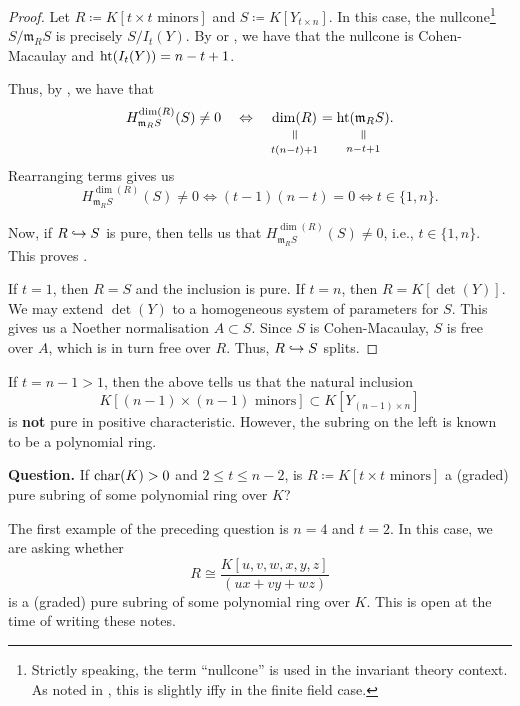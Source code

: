 \documentclass[12pt]{article}
\newcommand{\verteq}{\rotatebox{90}{$\,=$}}
\newcommand{\equalto}[2]{\underset{\scriptstyle\overset{\mkern4mu\verteq}{#2}}{#1}}
\begin{document}
\begin{proof} 
	Let $R \coloneqq K[\text{$t \times t$ minors}]$ and $S \coloneqq K[Y_{t \times n}]$. In this case, the nullcone\footnote{Strictly speaking, the term ``nullcone'' is used in the invariant theory context. As noted in , this is slightly iffy in the finite field case.} $S/\mathfrak{m}_{R} S$ is precisely $S/I_{t}(Y)$. By \cite{EagonNorthcott} or \cite{HochsterEagon}, we have that the nullcone is Cohen-Macaulay and $\operatorname{ht}(I_{t}(Y)) = n - t + 1$.

	Thus, by , we have that
	\begin{equation*} 
		H_{\mathfrak{m}_{R} S}^{\dim(R)}(S) \neq 0 \quad\Leftrightarrow\quad \equalto{\dim(R)}{t(n - t) + 1} = \equalto{\htt(\mathfrak{m}_{R}S)}{n - t + 1}.
	\end{equation*}
	Rearranging terms gives us
	\begin{equation*} 
		H_{\mathfrak{m}_{R} S}^{\dim(R)}(S) \neq 0 \Leftrightarrow (t - 1)(n - t) = 0 \Leftrightarrow t \in \{1, n\}.
	\end{equation*}

	Now, if $R \hookrightarrow S$ is pure, then  tells us that $H_{\mathfrak{m}_{R} S}^{\dim(R)}(S) \neq 0$, i.e., $t \in \{1, n\}$. This proves \forward. 

	\backward If $t = 1$, then $R = S$ and the inclusion is pure. If $t = n$, then $R = K[\det(Y)]$. We may extend $\det(Y)$ to a homogeneous system of parameters for $S$. This gives us a Noether normalisation $A \subset S$. Since $S$ is Cohen-Macaulay, $S$ is free over $A$, which is in turn free over $R$. Thus, $R \hookrightarrow S$ splits.
\end{proof}

\begin{rem}
	If $t = n - 1 > 1$, then the above tells us that the natural inclusion
	\begin{equation*} 
		K[\text{$(n - 1) \times (n - 1)$ minors}] \subset K[Y_{(n - 1) \times n}]
	\end{equation*}
	is \textbf{not} pure in positive characteristic. However, the subring on the left is known to be a polynomial ring.
\end{rem}

\textbf{Question.} If $\operatorname{char}(K) > 0$ and $2 \le t \le n - 2$, is $R \coloneqq K[\text{$t \times t$ minors}]$ a (graded) pure subring of some polynomial ring over $K$? 

The first example of the preceding question is $n = 4$ and $t = 2$. In this case, we are asking whether
\begin{equation*} 
	R \cong \dfrac{K[u, v, w, x, y, z]}{(ux + vy + wz)}
\end{equation*}
is a (graded) pure subring of some polynomial ring over $K$. This is open at the time of writing these notes.
\end{document}
